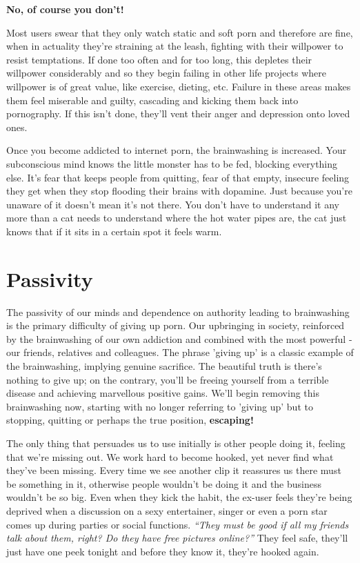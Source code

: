 \documentclass[
]{book}
\begin{document}
\textbf{No, of course you don't!}

Most users swear that they only watch static and soft porn and therefore are fine, when in actuality they're straining at the leash, fighting with their willpower to resist temptations. If done too often and for too long, this depletes their willpower considerably and so they begin failing in other life projects where willpower is of great value, like exercise, dieting, etc. Failure in these areas makes them feel miserable and guilty, cascading and kicking them back into pornography. If this isn't done, they'll vent their anger and depression onto loved ones.

Once you become addicted to internet porn, the brainwashing is increased. Your subconscious mind knows the little monster has to be fed, blocking everything else. It's fear that keeps people from quitting, fear of that empty, insecure feeling they get when they stop flooding their brains with dopamine. Just because you're unaware of it doesn't mean it's not there. You don't have to understand it any more than a cat needs to understand where the hot water pipes are, the cat just knows that if it sits in a certain spot it feels warm.

\hypertarget{passivity}{%
\section{Passivity}\label{passivity}}

The passivity of our minds and dependence on authority leading to brainwashing is the primary difficulty of giving up porn. Our upbringing in society, reinforced by the brainwashing of our own addiction and combined with the most powerful - our friends, relatives and colleagues. The phrase 'giving up' is a classic example of the brainwashing, implying genuine sacrifice. The beautiful truth is there's nothing to give up; on the contrary, you'll be freeing yourself from a terrible disease and achieving marvellous positive gains. We'll begin removing this brainwashing now, starting with no longer referring to 'giving up' but to stopping, quitting or perhaps the true position, \textbf{escaping!}

The only thing that persuades us to use initially is other people doing it, feeling that we're missing out. We work hard to become hooked, yet never find what they've been missing. Every time we see another clip it reassures us there must be something in it, otherwise people wouldn't be doing it and the business wouldn't be so big. Even when they kick the habit, the ex-user feels they're being deprived when a discussion on a sexy entertainer, singer or even a porn star comes up during parties or social functions. \emph{``They must be good if all my friends talk about them, right? Do they have free pictures online?''} They feel safe, they'll just have one peek tonight and before they know it, they're hooked again.
\end{document}
